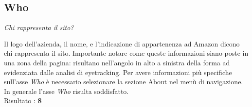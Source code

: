 \subsection{Who}
\begin{center}

\textit{Chi rappresenta il sito?}


\end{center}
\begin{flushleft}
Il logo dell'azienda, il nome, e l'indicazione di appartenenza ad Amazon 
dicono chi rappresenta il sito. Importante notare come queste 
informazioni siano poste in una zona  della pagina: risultano 
nell'angolo in alto a sinistra della forma ad  evidenziata 
dalle analisi di eyetracking. Per avere informazioni più specifiche sull'asse \textit{Who}
è necessario selezionare la sezione About nel menù di navigazione. \\
In generale l'asse \textit{Who} risulta soddisfatto. \\
Risultato : \textbf{8}
\end{flushleft}